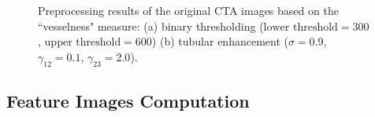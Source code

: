 \begin{figure}[!htb]
\centering
{}
\hfil
{}
\caption{Preprocessing results of the original CTA images based on the ``vesselness" measure: (a) binary thresholding ($\text{lower threshold} = 300$, $\text{upper threshold} = 600$) (b) tubular enhancement ($\sigma = 0.9$, $\gamma_{12} = 0.1$, $\gamma_{23} = 2.0$).}%
\label{fig:Preprocessing}
\end{figure}

\subsection{Feature Images Computation}

